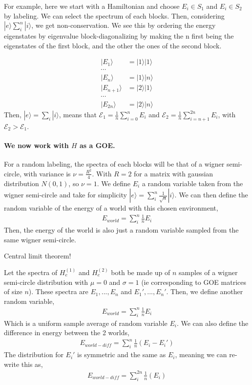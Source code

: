 \documentclass{article}
\begin{document}
For example, here we start with a Hamiltonian and choose $E_i\in S_1$ and $E_i\in S_2$ by labeling. We can select the spectrum of each blocks. 
Then, considering $|e\rangle\sum^{n}_i|i\rangle$, we get non-conservation. 
We see this by ordering the energy eigenstates by eigenvalue block-diagonalizing by making the n first being the eigenstates of the first block, and the other the ones of the second block. 

\begin{align}
|E_1\rangle&=|1\rangle|1\rangle\\
\cdots\\
|E_n\rangle&=|1\rangle|n\rangle\\
|E_{n+1}\rangle&=|2\rangle|1\rangle\\
\cdots\\
|E_{2n}\rangle&=|2\rangle|n\rangle
\end{align}
Then, $|e\rangle=\sum_i|i\rangle$, means that $\mathcal{E}_1=\frac{1}{n}
\sum^{n}_{i=0}E_i$ and $\mathcal{E}_2=\frac{1}{n}\sum^{2n}_{i=n+1}E_i$, with $\mathcal{E}_2>\mathcal{E}_1$.

\paragraph*{We now work with $H$ as a GOE.}
For a random labeling, the spectra of each blocks will be that of a wigner semi-circle, with variance is $\nu=\frac{R^2}{4}$. With $R=2$ for a matrix with gaussian distribution $N(0,1)$, so $\nu=1$.
We define $E_i$ a random variable taken from the wigner semi-circle and take for simplicity $|e\rangle=\sum^{n}_i\frac{1}{\sqrt{n}}|i\rangle$. 
We can then define the random variable of the energy of a world with this chosen environment,
\begin{eqnarray}
    E_{world}=\sum_i^n\frac{1}{n}E_i
\end{eqnarray}
Then, the energy of the world is also just a random variable sampled from the same wigner semi-circle.

Central limit theorem! 

Let the spectra of $H^{(1)}_e$ and $H^{(2)}_e$ both be made up of $n$ samples of a wigner semi-circle distribution with $\mu=0$ and $\sigma=1$ (ie corresponding to GOE matrices of size $n$). These spectra are $E_1, ..., E_n$ and $E_1', ..., E_n'$.
Then, we define another random variable, 
\begin{eqnarray}
    E_{world}=\sum_i^n\frac{1}{n}E_i
\end{eqnarray}
Which is a uniform sample average of random variable $E_i$. 
We can also define the difference in energy between the 2 worlds, 
\begin{eqnarray}
    E_{world-diff}=\sum_i^n\frac{1}{n}(E_i-E_i')
\end{eqnarray}
The distribution for $E_i'$ is symmetric and the same as $E_i$, meaning we can re-write this as,
\begin{eqnarray}
    E_{world-diff}=\sum_i^{2n}\frac{1}{n}(E_i)
\end{eqnarray}
\end{document}
